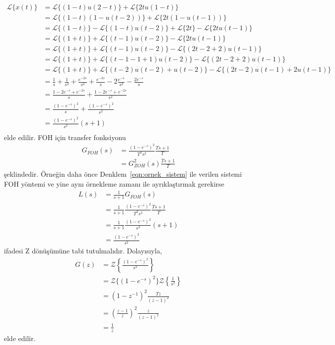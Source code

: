 \begin{equation}
\begin{split}
    \mathcal{L}\{x(t)\}&=\mathcal{L}\{(1-t)u(2-t)\}+\mathcal{L}\{2tu(1-t)\}\\
    &=\mathcal{L}\{(1-t)(1-u(t-2))\}+\mathcal{L}\{2t(1-u(t-1))\}\\
    &=\mathcal{L}\{(1-t)\}-\mathcal{L}\{(1-t)u(t-2)\}+\mathcal{L}\{2t\}-\mathcal{L}\{2tu(t-1)\}\\
    &=\mathcal{L}\{(1+t)\}+\mathcal{L}\{(t-1)u(t-2)\}-\mathcal{L}\{2tu(t-1)\}\\
    &=\mathcal{L}\{(1+t)\}+\mathcal{L}\{(t-1)u(t-2)\}-\mathcal{L}\{(2t-2+2)u(t-1)\}\\
    &=\mathcal{L}\{(1+t)\}+\mathcal{L}\{(t-1-1+1)u(t-2)\}-\mathcal{L}\{(2t-2+2)u(t-1)\}\\
    &=\mathcal{L}\{(1+t)\}+\mathcal{L}\{(t-2)u(t-2)+u(t-2)\}-\mathcal{L}\{(2t-2)u(t-1)+2u(t-1)\}\\
    &=\frac{1}{s}+\frac{1}{s^2}+\frac{e^{-2s}}{s^2}+\frac{e^{-2s}}{s}-2\frac{e^{-s}}{s^2}-\frac{2e^{-s}}{s}\\
    &=\frac{1-2e^{-s}+e^{-2s}}{s}+\frac{1-2e^{-s}+e^{-2s}}{s^2}\\
    &=\frac{(1-e^{-s})^2}{s}+\frac{(1-e^{-s})^2}{s^2}\\
    &=\frac{(1-e^{-s})^2}{s^2}(s+1)\\
\end{split}
\end{equation}
elde edilir. FOH için transfer fonksiyonu
\begin{equation}
    \begin{split}
        G_{FOH}(s)&=\frac{(1-e^{-s})^2}{T^2s^2}\frac{Ts+1}{T}\\
        &=G_{ZOH}^2(s)\frac{Ts+1}{T}
\end{split}
\end{equation}
şeklindedir. Örneğin daha önce Denklem~\ref{eqn:ornek_sistem} ile verilen sistemi FOH yöntemi ve yine aynı örnekleme zamanı ile ayrıklaştırmak gerekirse
\begin{equation}
\begin{split}
    L(s)&=\frac{1}{s+1}G_{FOH}(s)\\
    &=\frac{1}{s+1}\frac{(1-e^{-s})^2}{T^2s^2}\frac{Ts+1}{T}\\
    &=\frac{1}{s+1}\frac{(1-e^{-s})^2}{s^2}(s+1)\\
    &=\frac{(1-e^{-s})^2}{s^2}
\end{split}
\end{equation}
ifadesi Z dönüşümüne tabi tutulmalıdır. Dolayısıyla,
\begin{equation}
    \begin{split}
        G(z)&=\mathcal{Z}\left\{\frac{(1-e^{-s})^2}{s^2}\right\}\\
        &=\mathcal{Z}\{(1-e^{-s})^2\}\mathcal{Z}\left\{\frac{1}{s^2}\right\}\\
        &=\left(1-z^{-1}\right)^2\frac{Tz}{(z-1)^2}\\
        &=\left(\frac{z-1}{z}\right)^2\frac{z}{(z-1)^2}\\
        &=\frac{1}{z}
    \end{split}
\end{equation}
elde edilir.